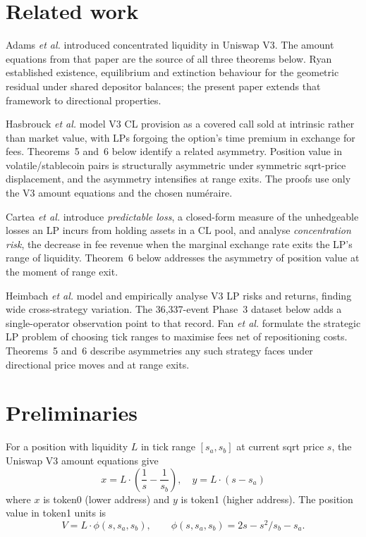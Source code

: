 \documentclass[11pt,a4paper]{article}
\theoremstyle{definition}
\begin{document}
\section{Related work}

Adams \emph{et al.}\cite{adams2021} introduced concentrated liquidity in Uniswap V3. The amount equations from that paper are the source of all three theorems below. Ryan\cite{ryan2026a} established existence, equilibrium and extinction behaviour for the geometric residual under shared depositor balances; the present paper extends that framework to directional properties.

Hasbrouck \emph{et al.}\cite{hasbrouck2025} model V3 CL provision as a covered call sold at intrinsic rather than market value, with LPs forgoing the option's time premium in exchange for fees. Theorems~5 and~6 below identify a related asymmetry. Position value in volatile/stablecoin pairs is structurally asymmetric under symmetric sqrt-price displacement, and the asymmetry intensifies at range exits. The proofs use only the V3 amount equations and the chosen num\'eraire.

Cartea \emph{et al.}\cite{cartea2024} introduce \emph{predictable loss}, a closed-form measure of the unhedgeable losses an LP incurs from holding assets in a CL pool, and analyse \emph{concentration risk}, the decrease in fee revenue when the marginal exchange rate exits the LP's range of liquidity. Theorem~6 below addresses the asymmetry of position value at the moment of range exit.

Heimbach \emph{et al.}\cite{heimbach2022} model and empirically analyse V3 LP risks and returns, finding wide cross-strategy variation. The 36{,}337-event Phase~3 dataset below adds a single-operator observation point to that record. Fan \emph{et al.}\cite{fan2023} formulate the strategic LP problem of choosing tick ranges to maximise fees net of repositioning costs. Theorems~5 and~6 describe asymmetries any such strategy faces under directional price moves and at range exits.

\section{Preliminaries}

For a position with liquidity $L$ in tick range $[s_a, s_b]$ at current sqrt price $s$, the Uniswap V3 amount equations give
\begin{equation}\label{eq:amounts-prelim}
x = L \cdot \left(\frac{1}{s} - \frac{1}{s_b}\right), \quad y = L \cdot (s - s_a)
\end{equation}
where $x$ is token0 (lower address) and $y$ is token1 (higher address). The position value in token1 units is
\begin{equation}\label{eq:value-prelim}
V = L \cdot \phi(s, s_a, s_b), \qquad \phi(s, s_a, s_b) = 2s - s^2/s_b - s_a.
\end{equation}
\end{document}
